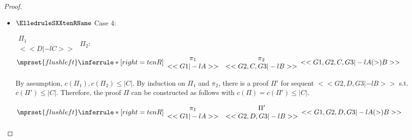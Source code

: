 \begin{proof}
\begin{enumerate}
\begin{itemize}
  \item $\ElledruleSXXtenRName$ Case 4:
      \begin{center}
        \scriptsize
        \begin{math}
          \begin{array}{c}
            \Pi_1 \\
            {<<D |-l C>>}
          \end{array}
        \end{math}
        \qquad\qquad
        $\Pi_2$:
        \begin{math}
          $$\mprset{flushleft}
          \inferrule* [right={\tiny tenR}] {
            {
              \begin{array}{cc}
                \pi_1 & \pi_2 \\
                {<<G1 |-l A>>} & {<<G2, C, G3 |-l B>>}
              \end{array}
            }
          }{<<G1, G2, C, G3 |-l A (>) B>>}
        \end{math}
      \end{center}
      By assumption, $c(\Pi_1),c(\Pi_2)\leq |C|$. By induction on $\Pi_1$ and $\pi_2$, there
      is a proof $\Pi'$ for sequent $<<G2, D, G3 |-l B>>$ s.t. $c(\Pi') \leq |C|$. Therefore,
      the proof $\Pi$ can be constructed as follows with $c(\Pi) = c(\Pi') \leq |C|$.
      \begin{center}
        \scriptsize
        \begin{math}
          $$\mprset{flushleft}
          \inferrule* [right={\tiny tenR}] {
            {
              \begin{array}{cc}
                \pi_1 & \Pi' \\
                {<<G1 |-l A>>} & {<<G2, D, G3 |-l B>>}
              \end{array}
            }
          }{<<G1, G2, D, G3 |-l A (>) B>>}
        \end{math}
      \end{center}


\end{itemize}
\end{enumerate}
\end{proof}
